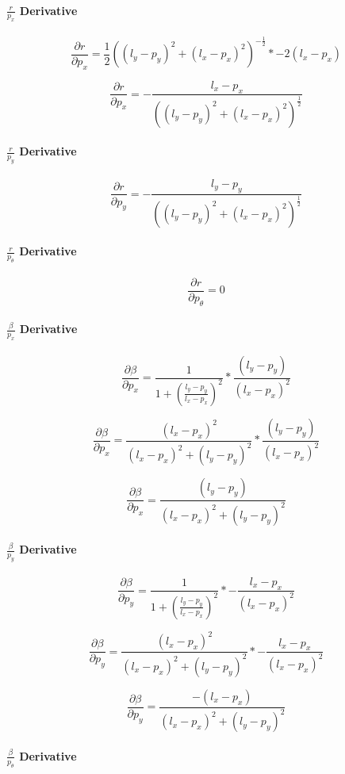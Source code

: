 \documentclass[12pt, a4paper]{article}
\begin{document}
\paragraph{$\frac{r}{p_x}$ Derivative}
$$\frac{\partial r}{\partial p_x} = \frac{1}{2}((l_y - p_y)^2 + (l_x - p_x)^2)^{-\frac{1}{2}} * -2(l_x - p_x)$$

$$\frac{\partial r}{\partial p_x} = -\frac{l_x - p_x}{((l_y - p_y)^2 + (l_x - p_x)^2)^{\frac{1}{2}}}$$

\paragraph{$\frac{r}{p_y}$ Derivative}

$$\frac{\partial r}{\partial p_y} = -\frac{l_y - p_y}{((l_y - p_y)^2 + (l_x - p_x)^2)^{\frac{1}{2}}}$$

\paragraph{$\frac{r}{p_{\theta}}$ Derivative}
$$\frac{\partial r}{\partial p_{\theta}} = 0 $$


\paragraph{$\frac{\beta}{p_x}$ Derivative}

$$\frac{\partial \beta}{\partial p_x} = \frac{1}{1 + (\frac{l_y - p_y}{l_x - p_x})^2} * \frac{(l_y - p_y)}{(l_x - p_x)^2}$$

$$\frac{\partial \beta}{\partial p_x} = \frac{(l_x - p_x)^2}{(l_x - p_x)^2 + (l_y - p_y)^2} * \frac{(l_y - p_y)}{(l_x - p_x)^2}$$

$$\frac{\partial \beta}{\partial p_x} = \frac{(l_y - p_y)}{(l_x - p_x)^2 + (l_y - p_y)^2}$$

\paragraph{$\frac{\beta}{p_y}$ Derivative}
$$\frac{\partial \beta}{\partial p_y} = \frac{1}{1 + (\frac{l_y - p_y}{l_x - p_x})^2} * -\frac{l_x - p_x}{(l_x - p_x)^2} $$

$$\frac{\partial \beta}{\partial p_y} = \frac{(l_x - p_x)^2}{(l_x - p_x)^2 + (l_y - p_y)^2} * -\frac{l_x - p_x}{(l_x - p_x)^2}$$

$$\frac{\partial \beta}{\partial p_y} = \frac{-(l_x - p_x)}{(l_x - p_x)^2 + (l_y - p_y)^2}$$

\paragraph{$\frac{\beta}{p_{\theta}}$ Derivative}
\end{document}
